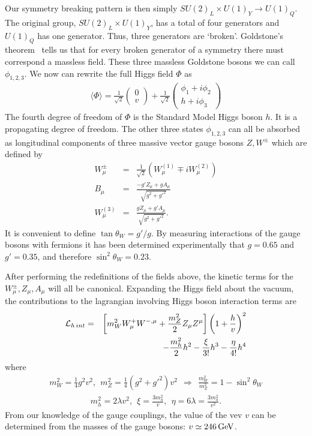 \documentclass[12pt]{article}
\def\beq{\begin{eqnarray}}
\def\eeq{\end{eqnarray}}
\def\bea{\begin{eqnarray}}
\def\eea{\end{eqnarray}}
\def\gev{\, {\rm GeV}}
\begin{document}
Our symmetry breaking pattern is then simply $SU(2)_L\times U(1)_Y\to U(1)_Q$. The original group, $SU(2)_L\times U(1)_Y$, has a total of four generators and $U(1)_Q$ has one generator. Thus, three generators are `broken'. Goldstone's theorem~\cite{Goldstone:1962es} tells us that for every broken generator of a symmetry there must correspond a massless field.  These three massless Goldstone bosons we can call $\phi_{1,2,3}$. We now can rewrite the full Higgs field $\Phi$ as
\beq
\langle \Phi\rangle =\frac{1}{\sqrt{2}}\left( \begin{array}{c} 0 \\ v\end{array}\right)
+\frac{1}{\sqrt{2}} \left( \begin{array}{c} \phi_1+i\phi_2 \\ h+i\phi_3\end{array}\right)
\eeq
The fourth degree of freedom of $\Phi$ is the Standard Model Higgs boson $h$. It is a propagating degree of freedom. The other three states $\phi_{1,2,3}$ can all be absorbed as longitudinal components of three massive vector gauge bosons $Z,W^\pm$ which are defined by
\bea
W^\pm_\mu & = & \frac{1}{\sqrt{2}}\left( W^{(1)}_\mu\mp i W^{(2)}_\mu\right) \\
B_\mu & = & \frac{-g'Z_\mu+gA_\mu}{\sqrt{g^2+g'^2}} \\
W^{(3)}_\mu & = & \frac{g Z_\mu+g' A_\mu}{\sqrt{g^2+g'^2}}.
\eeq
It is convenient to define $\tan\theta_W=g'/g$. By measuring interactions of the gauge bosons with fermions it has been determined experimentally that $g=0.65$ and $g'=0.35$, and therefore
$\sin^2\theta_W=0.23$. 

After performing the redefinitions of the fields above, the kinetic terms for the $W^\pm_\mu, Z_\mu, A_\mu$ will all be canonical. Expanding the Higgs field about the vacuum, the contributions to the lagrangian involving Higgs boson interaction terms are
\bea
{\cal L}_{h\, int}& = &\left[ m_W^2W^+_\mu W^{-,\mu}+\frac{m_Z^2}{2}Z_\mu Z^\mu\right]  \left( 1+\frac{h}{v}\right)^2 \\
& & -\frac{m_h^2}{2}h^2-\frac{\xi}{3!}h^3-\frac{\eta}{4!} h^4
\eea
where
\beq
m^2_W=\frac{1}{4}g^2v^2,~~m_Z^2=\frac{1}{4}(g^2+g'^2)v^2~~\Longrightarrow~~
\frac{m_W^2}{m^2_Z}=1-\sin^2\theta_W
\eeq
\beq
m^2_h=2\lambda v^2,~~\xi=\frac{3m^2_h}{v},~~\eta=6\lambda=\frac{3m^2_h}{v^2}.
\eeq
From our knowledge of the gauge couplings, the value of the vev $v$ can be determined from the masses of the gauge bosons: $v\simeq 246\gev$.
\end{document}
